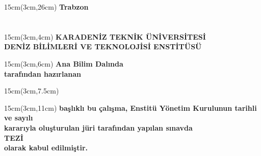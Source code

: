 \documentclass[a4paper,12pt]{article}
\begin{document}
\begin{center}
\begin{textblock*}{15cm}(3cm,26cm)
\textbf{Trabzon \space \THESISYEAR}
\end{textblock*}

\end{center}


\section*{}
\newpage

\begin{center}

\begin{textblock*}{15cm}(3cm,4cm)
\textbf{KARADENİZ TEKNİK ÜNİVERSİTESİ}\\
\textbf{DENİZ BİLİMLERİ VE TEKNOLOJİSİ ENSTİTÜSÜ}\\
\end{textblock*}

\begin{textblock*}{15cm}(3cm,6cm)
\textbf{
\ABDB \space Ana Bilim Dalında \\
\AUTHORNAME \space tarafından hazırlanan \\
}
\end{textblock*}

\begin{textblock*}{15cm}(3cm,7.5cm)
\textbf{\TURKISHTITLEB \\ }
\end{textblock*}

\begin{textblock*}{15cm}(3cm,11cm)
\textbf{
başlıklı bu çalışma, Enstitü Yönetim Kurulunun \ENSTKARARTARIHI \space tarihli ve \ENSTKARARNO \space sayılı\\ kararıyla oluşturulan jüri tarafından yapılan sınavda\\
\DEGREE \space TEZİ \\
olarak kabul edilmiştir.
}
\end{textblock*}
\end{center}
\end{document}
